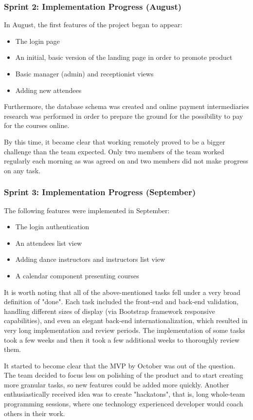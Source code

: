 \documentclass{article}
\begin{document}
\subsubsection{Sprint 2: Implementation Progress (August)}
In August, the first features of the project began to appear:
\begin{itemize}
\item The login page
\item An initial, basic version of the landing page in order to promote product
\item Basic manager (admin) and receptionist views
\item Adding new attendees
\end{itemize}
Furthermore, the database schema was created and online payment intermediaries research was performed in order to prepare the ground for the possibility to pay for the courses online.

By this time, it became clear that working remotely proved to be a bigger challenge than the team expected. Only two members of the team worked regularly each morning as was agreed on and two members did not make progress on any task.

\subsubsection{Sprint 3: Implementation Progress (September)}
The following features were implemented in September:
\begin{itemize}
\item The login authentication
\item An attendees list view
\item Adding dance instructors and instructors list view
\item A calendar component presenting courses
\end{itemize}
It is worth noting that all of the above-mentioned tasks fell under a very broad definition of "done". Each task included the front-end and back-end validation, handling different sizes of display (via Bootstrap framework responsive capabilities), and even an elegant back-end internationalization, which resulted in very long implementation and review periods. The implementation of some tasks took a few weeks and then it took a few additional weeks to thoroughly review them.

It started to become clear that the MVP by October was out of the question. The team decided to focus less on polishing of the product and to start creating more granular tasks, so new features could be added more quickly. Another enthusiastically received idea was to create "hackatons", that is, long whole-team programming sessions, where one technology experienced developer would coach others in their work.
\end{document}
